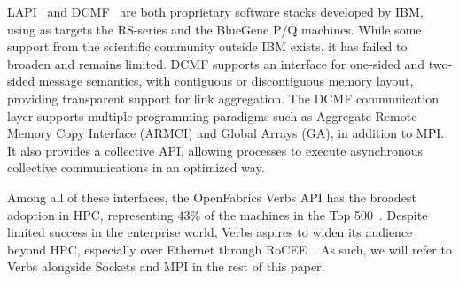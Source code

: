 LAPI~\cite{lapi_a_1998} and DCMF~\cite{Kumar:2008:DCM:1375527.1375544}
are both proprietary software stacks developed by IBM, using as targets
the RS-series and the BlueGene P/Q machines. While some support
from the scientific community outside IBM exists, it has failed to
broaden and remains limited. DCMF supports an
interface for one-sided and two-sided message semantics, with
contiguous or discontiguous memory layout, providing transparent support 
for link aggregation. The DCMF communication layer supports 
multiple programming paradigms such as Aggregate Remote Memory Copy Interface 
(ARMCI) and Global Arrays (GA), in addition to MPI. It also provides 
a collective API, allowing processes to execute asynchronous collective
communications in an optimized way.

Among all of these interfaces, the OpenFabrics Verbs API has the broadest adoption in HPC, 
representing 43\% of the machines in the Top 500~\cite{top500}. Despite 
limited success in the enterprise world, Verbs aspires to widen its audience 
beyond HPC, especially over Ethernet through RoCEE~\cite{RoCEE}. As such, we 
will refer to Verbs alongside Sockets and MPI in the rest of this paper.
